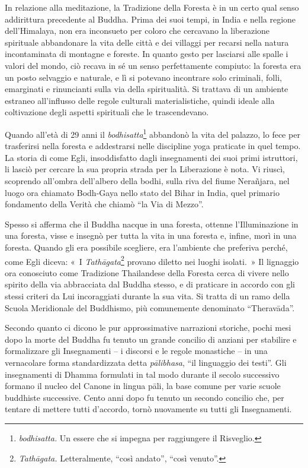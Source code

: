 In relazione alla meditazione, la Tradizione della Foresta è in un certo
qual senso addirittura precedente al Buddha. Prima dei suoi tempi, in
India e nella regione dell'Himalaya, non era inconsueto per coloro che
cercavano la liberazione spirituale abbandonare la vita delle città e
dei villaggi per recarsi nella natura incontaminata di montagne e
foreste. In quanto gesto per lasciarsi alle spalle i valori del mondo,
ciò recava in sé un senso perfettamente compiuto: la foresta era un
posto selvaggio e naturale, e lì si potevano incontrare solo criminali,
folli, emarginati e rinuncianti sulla via della spiritualità. Si
trattava di un ambiente estraneo all'influsso delle regole culturali
materialistiche, quindi ideale alla coltivazione degli aspetti
spirituali che le trascendevano.

Quando all'età di 29 anni il \emph{bodhisatta}\footnote{\emph{bodhisatta.}
  Un essere che si impegna per raggiungere il Risveglio.} abbandonò la
vita del palazzo, lo fece per trasferirsi nella foresta e addestrarsi
nelle discipline yoga praticate in quel tempo. La storia di come Egli,
insoddisfatto dagli insegnamenti dei suoi primi istruttori, li lasciò
per cercare la sua propria strada per la Liberazione è nota. Vi riuscì,
scoprendo all'ombra dell'albero della bodhi, sulla riva del fiume
Nerañjara, nel luogo ora chiamato Bodh-Gaya nello stato del Bihar in
India, quel primario fondamento della Verità che chiamò ``la Via di
Mezzo''.

Spesso si afferma che il Buddha nacque in una foresta, ottenne
l'Illuminazione in una foresta, visse e insegnò per tutta la vita in una
foresta e, infine, morì in una foresta. Quando gli era possibile
scegliere, era l'ambiente che preferiva perché, come Egli diceva: «~I
\emph{Tathāgata}\footnote{\emph{Tathāgata.} Letteralmente, ``così
  andato'', ``così venuto''.} provano diletto nei luoghi isolati.~» Il
lignaggio ora conosciuto come Tradizione Thailandese della Foresta cerca
di vivere nello spirito della via abbracciata dal Buddha stesso, e di
praticare in accordo con gli stessi criteri da Lui incoraggiati durante
la sua vita. Si tratta di un ramo della Scuola Meridionale del
Buddhismo, più comunemente denominato ``Theravāda''.

Secondo quanto ci dicono le pur approssimative narrazioni storiche,
pochi mesi dopo la morte del Buddha fu tenuto un grande concilio di
anziani per stabilire e formalizzare gli Insegnamenti -- i discorsi e le
regole monastiche -- in una vernacolare forma standardizzata detta
\emph{pālibhasa}, ``il linguaggio dei testi''. Gli insegnamenti di
Dhamma formulati in tal modo durante il secolo successivo formano il
nucleo del Canone in lingua pāli, la base comune per varie scuole
buddhiste successive. Cento anni dopo fu tenuto un secondo concilio che,
per tentare di mettere tutti d'accordo, tornò nuovamente su tutti gli
Insegnamenti.

